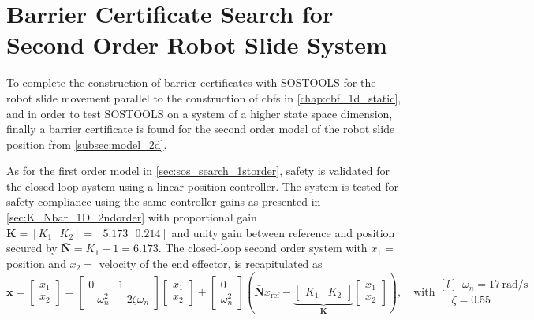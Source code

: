 
\section{Barrier Certificate Search for Second Order Robot Slide System}\label{sec:sos_2ndorder_error}

To complete the construction of barrier certificates with SOSTOOLS for the robot slide movement parallel to the construction of \glspl{cbf} in \autoref{chap:cbf_1d_static}, and in order to test SOSTOOLS on a system of a higher state space dimension, finally a barrier certificate is found for the second order model of the robot slide position from \autoref{subsec:model_2d}. 

As for the first order model in \autoref{sec:sos_search_1storder}, safety is validated for the closed loop system using a linear position controller. The system is tested for safety compliance using the same controller gains as presented in \autoref{sec:K_Nbar_1D_2ndorder} with proportional gain $\mathbf{K}=[K_1\,\,\,\,K_2]=[5.173\,\,\,\,0.214]$ and unity gain between reference and position secured by $\bar{\mathbf{N}}=K_1+1=6.173$. The closed-loop second order system with $x_1=$ position and $x_2=$ velocity of the end effector, is recapitulated as
\begin{equation}
\dot{\mathbf{x}} = 
\dot{\begin{bmatrix}
	x_1\\x_2
	\end{bmatrix}} = 
\begin{bmatrix}
0 & 1\\
-\omega_n^2  & -2\zeta \omega_n  
\end{bmatrix}
\begin{bmatrix}
x_1\\x_2
\end{bmatrix} + 
\begin{bmatrix}
0\\\omega_n^2
\end{bmatrix}\left(\bar{\mathbf{N}}x_\text{ref}-
\underbrace{\begin{bmatrix}
K_1 & K_2
\end{bmatrix}}_{\mathbf{K}}
\begin{bmatrix}
x_1\\x_2
\end{bmatrix}\right),
 \quad \text{with}
\begin{matrix*}[l]
\phantom{\zeta}\omega_n = 17 \,\text{rad/s}\\  \phantom{\omega_n}\zeta = 0.55
\end{matrix*}
\label{eq:sos_2ndorder}
\end{equation}
